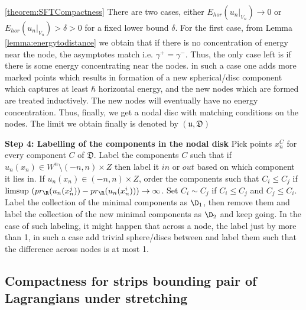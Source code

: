 \begin{sketch}{\ref{theorem:SFTCompactness}}
There are two cases, either $E_{hor}(u_n|_{V_n}) \to 0$ or $E_{hor}(u_n|_{V_n}) > \delta > 0$ for a fixed lower bound $\delta$. For the first case,  from Lemma \ref{lemma:energytodistance} we obtain that if there is no concentration of energy near the node, the asymptotes match i.e. $\gamma^+ = \gamma^-$. Thus, the only case left is if there is some energy concentrating near the nodes. in such a case one adds more marked points which results in formation of a new spherical/disc component which captures at least $\hbar$ horizontal energy, and the new nodes which are formed are treated inductively. The new nodes will eventually have no energy concentration. Thus, finally, we get a nodal disc with matching conditions on the nodes. The limit we obtain finally is denoted by $(\mathfrak{u,D})$


\vskip 3pt
\textbf{Step 4: Labelling of the components in the nodal disk}
Pick points $x_n^C$ for every component $C$ of $\mathfrak{ D}$. Label the components $C$ such that if  $u_n(x_n)\in W^n\setminus(-n,n)\times Z $ then label it $in$ or $out$ based on which component it lies in. If $u_n(x_n) \in (-n,n)\times Z $, order the components such that $C_i \leq C_j$ if $\text{limsup } (pr_\R (u_n(x^j_n)) - pr_\R (u_n(x^i_n))) \to \infty $. Set $C_i \sim C_j$ if $C_i\leq C_j$ and $C_j\leq C_i$.  Label the collection of the minimal components as $\D_1$, then remove them and label the collection of the new minimal components as $\D_2$ and keep going. In the case of such labeling, it might happen that across a node, the label just by more than 1, in such a case add trivial sphere/discs between and label them such that the difference across nodes is at most 1.


\end{sketch}

\subsection{ Compactness for strips bounding pair of Lagrangians under stretching}
    
